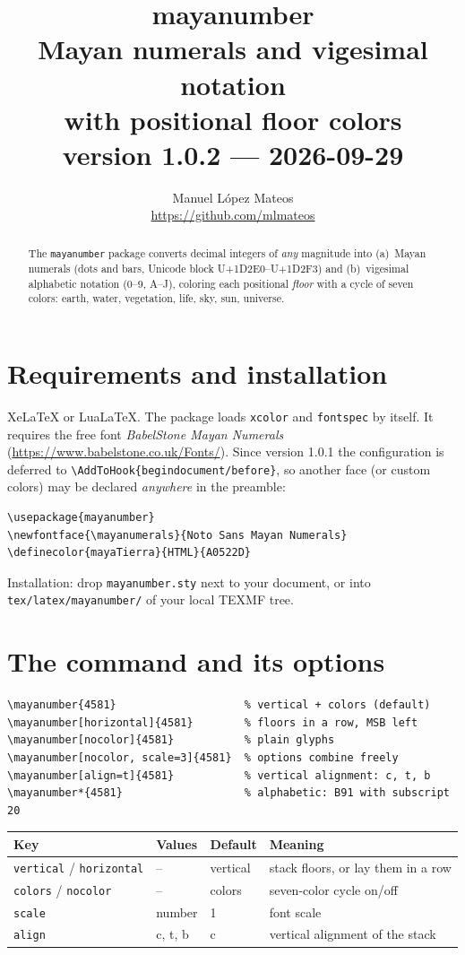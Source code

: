 \documentclass[11pt]{article}
\title{\textbf{mayanumber}\\[4pt]
  \large Mayan numerals and vigesimal notation\\ with positional floor colors\\[6pt]
  version 1.0.2 --- 2026-09-29}
\author{Manuel López Mateos\\ \url{https://github.com/mlmateos}}
\date{}
\begin{document}
\maketitle

\begin{abstract}\noindent
The \texttt{mayanumber} package converts decimal integers of \emph{any}
magnitude into (a)~Mayan numerals (dots and bars, Unicode block
U+1D2E0--U+1D2F3) and (b)~vigesimal alphabetic notation (0--9, A--J),
coloring each positional \emph{floor} with a cycle of seven colors:
earth, water, vegetation, life, sky, sun, universe.
\end{abstract}

\section{Requirements and installation}

XeLaTeX or LuaLaTeX. The package loads \texttt{xcolor} and \texttt{fontspec}
by itself. It requires the free font \emph{BabelStone Mayan Numerals}
(\url{https://www.babelstone.co.uk/Fonts/}). Since version 1.0.1 the
configuration is deferred to \verb|\AddToHook{begindocument/before}|, so
another face (or custom colors) may be declared \emph{anywhere} in the
preamble:

\begin{verbatim}
\usepackage{mayanumber}
\newfontface{\mayanumerals}{Noto Sans Mayan Numerals}
\definecolor{mayaTierra}{HTML}{A0522D}
\end{verbatim}

Installation: drop \texttt{mayanumber.sty} next to your document, or into
\texttt{tex/latex/mayanumber/} of your local TEXMF tree.

\section{The command and its options}

\begin{verbatim}
\mayanumber{4581}                    % vertical + colors (default)
\mayanumber[horizontal]{4581}        % floors in a row, MSB left
\mayanumber[nocolor]{4581}           % plain glyphs
\mayanumber[nocolor, scale=3]{4581}  % options combine freely
\mayanumber[align=t]{4581}           % vertical alignment: c, t, b
\mayanumber*{4581}                   % alphabetic: B91 with subscript 20
\end{verbatim}

\begin{center}
\begin{tabular}{lllp{6cm}}
\textbf{Key} & \textbf{Values} & \textbf{Default} & \textbf{Meaning}\\\hline
\texttt{vertical} / \texttt{horizontal} & -- & vertical & stack floors, or lay them in a row\\
\texttt{colors} / \texttt{nocolor} & -- & colors & seven-color cycle on/off\\
\texttt{scale} & number & 1 & font scale\\
\texttt{align} & c, t, b & c & vertical alignment of the stack\\
\end{tabular}
\end{center}
\end{document}
